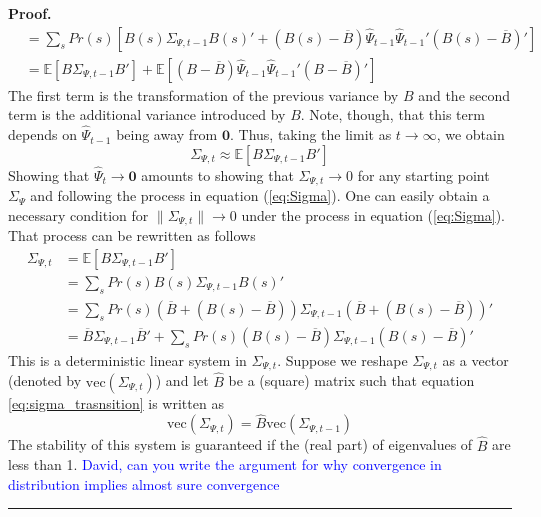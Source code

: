 \documentclass[thmsb,11pt]{article}
\newenvironment{proof}[1][Proof]{\noindent \textbf{#1.} }{\  \rule{0.5em}{0.5em}}
\begin{document}
\begin{proof}
\begin{align}
 		&=\sum_s Pr(s)\left[ B(s)\Sigma_{\Psi,t-1} B(s)' +(B(s)-\overline B)\hat{\Psi}_{t-1}\hat{\Psi}_{t-1}'(B(s)-\overline B)'\right]\nonumber\\
 		&= \mathbb{E}[B\Sigma_{\Psi,t-1}B'] +\mathbb{E}[(B-\overline B)\hat{\Psi}_{t-1}\hat{\Psi}_{t-1}'(B-\overline B)']\label{eq:SigmaFull}
 	\end{align}
 	The first term is the transformation of the previous variance by $B$ and the second term is the additional variance introduced by  $B$.  Note, though, that this term depends on $\hat{\Psi}_{t-1}$ being away from $\bm 0$.  Thus, taking the limit as $t\rightarrow\infty$, we obtain
	\begin{equation}
		\Sigma_{\Psi,t} \approx \mathbb{E}[B \Sigma_{\Psi,t-1} B'] \label{eq:Sigma}
	\end{equation}  Showing that $\hat{\Psi}_t \rightarrow \bm 0$ amounts to showing that $\Sigma_{\Psi,t}\rightarrow 0$ for any starting point $\Sigma_{\Psi}$ and following the process in equation (\ref{eq:Sigma}).  One can easily obtain a necessary condition for $\|\Sigma_{\Psi,t}\|\rightarrow 0$ under the process in equation (\ref{eq:Sigma}).
	That process can be rewritten as follows
	\begin{align}
		\Sigma_{\Psi,t} &= \mathbb{E}[B \Sigma_{\Psi,t-1} B']\\
				    &=\sum_s Pr(s) B(s) \Sigma_{\Psi,t-1} B(s)'\\
				   &=\sum_s Pr(s) (\overline B+(B(s)-\overline B))\Sigma_{\Psi,t-1}(\overline B+(B(s)-\overline B))'\\
				  &=\overline B \Sigma_{\Psi,t-1}\overline B' +\sum_sPr(s) (B(s)-\overline B)\Sigma_{\Psi,t-1}(B(s)-\overline B)'\label{eq:sigma_trasnsition}
	\end{align}
% 	
 	This is a deterministic linear system in $\Sigma_{\Psi,t}$. Suppose we reshape $\Sigma_{\Psi,t}$  as a vector (denoted by $\text{vec}(\Sigma_{\Psi,t})$) and let $\hat{B}$ be a (square) matrix such that equation \ref{eq:sigma_trasnsition} is written as 
% 	
 \[\text{vec}(\Sigma_{\Psi,t})=\hat{B}\text{vec}( \Sigma_{\Psi,t-1})\]	
% 
 The stability of this system is guaranteed if the (real part) of eigenvalues of $\hat{B}$ are less than 1.  
\textcolor{blue}{David, can you write the argument for why convergence in distribution implies almost sure convergence }
 \end{proof}


\smallskip \ \pagebreak

\smallskip



\end{document}
